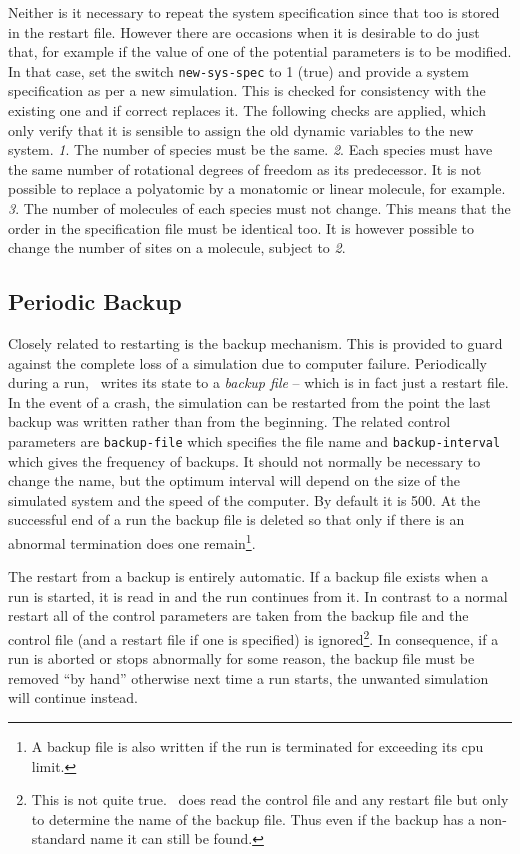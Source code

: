 Neither is it necessary to repeat the system specification since that
too is stored in the restart file.  However there are occasions
when it is desirable to do just that, for example if the value of one
of the potential parameters is to be modified.  In that case, set the
switch \verb'new-sys-spec' to 1 (true) and provide a system
specification as per a new simulation.  This is checked for
consistency with the existing one and if correct replaces it.  The
following checks are applied, which only verify that it is sensible to
assign the old dynamic variables to the new system. {\em 1}. The
number of species must be the same. {\em 2}. Each species must have
the same number of rotational degrees of freedom as its predecessor.
It is not possible to replace a polyatomic by a monatomic or
linear molecule, for example.  {\em 3}. The number of molecules of
each species must not change.  This means that the order in the
specification file must be identical too.  It is however possible to
change the number of sites on a molecule, subject to {\em 2}.

\subsection{Periodic Backup}
\label{sec:backup}
Closely related to restarting is the backup mechanism.  This is
provided to guard against the complete loss of a simulation due to
computer failure. Periodically during a run, \moldy\  writes its state
to a {\em backup file\/} -- which is in fact just a restart file.  In
the event of a crash, the simulation can be restarted from the point
the last backup was written rather than from the beginning. The
related control parameters are \verb'backup-file' which specifies the
file name and \verb'backup-interval' which gives the frequency of
backups.  It should not normally be necessary to change the name, but
the optimum interval will depend on the size of the simulated system
and the speed of the computer. By default it is 500.  At the
successful end of a run the backup file is deleted so that only if
there is an abnormal termination does one remain\footnote{A backup
file is also written if the run is terminated for exceeding its cpu
limit.}.

The restart from a backup is entirely automatic. If a backup file
exists when a run is started, it is read in and the run continues from
it.  In contrast to a normal restart all of the control parameters are
taken from the backup file and the control file (and a restart file if
one is specified) is ignored\footnote{This is not quite true. \moldy\
does read the control file and any restart file but only to determine
the name of the backup file. Thus even if the backup has a
non-standard name it can still be found.}.  In consequence, if a run
is aborted or stops abnormally for some reason, the backup file must
be removed ``by hand'' otherwise next time a run starts, the unwanted
simulation will continue instead.

